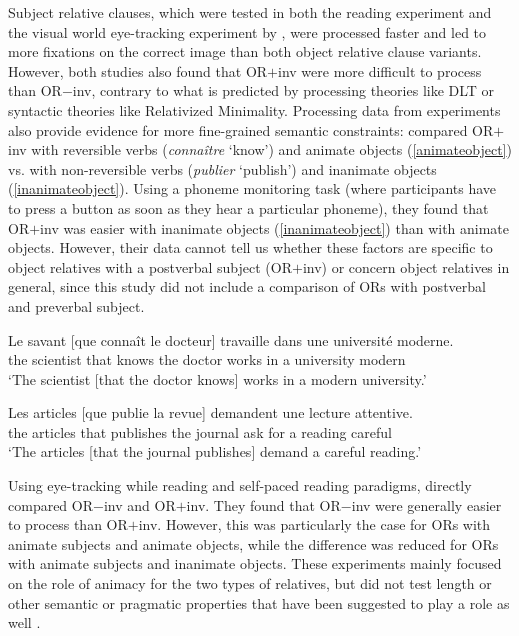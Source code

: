 \documentclass[output=paper]{langscibook}
\begin{document}
Subject relative clauses, which were tested in both the
\citet{Holmes1981} reading experiment and the visual world
eye-tracking experiment by \citet{pozniak2015processing}, were
processed faster and led to more fixations on the correct image than
both object relative clause variants. However, both studies also found
that OR$+$inv were more difficult to process than OR$-$inv, contrary to
what is predicted by processing theories like DLT or syntactic
theories like Relativized Minimality.  Processing data from
experiments also provide evidence for more fine-grained semantic
constraints: \citet{Frauenfelder1980} compared OR$+$inv with reversible
verbs (\textit{connaître} `know’) and animate objects
(\ref{animateobject}) vs. with non-reversible verbs
(\textit{publier} `publish’) and inanimate objects
(\ref{inanimateobject}). Using a phoneme monitoring task (where
participants have to press a button as soon as they hear a particular
phoneme), they found that OR$+$inv was easier with inanimate objects
(\ref{inanimateobject}) than with animate objects. However, their data
cannot tell us whether these factors are specific to object relatives
with a postverbal subject (OR$+$inv) or concern object relatives in
general, since this study did not include a comparison of ORs with
postverbal and preverbal subject.

\begin{exe}
\ex \label{animateobject}
\gll Le savant [que connaît le docteur] travaille dans une université moderne. 
 \\   
 the scientist that knows the doctor works in a university modern \\
\glt `The scientist [that the doctor knows] works in a modern university.'

\ex \label{inanimateobject}
\gll Les articles [que publie la revue] demandent une lecture attentive. \\    
 the articles that publishes the journal {ask for} a reading careful\\
\glt `The articles [that the journal publishes] demand a careful reading.'
\end{exe}


Using eye-tracking while reading and self-paced reading paradigms,
\citet{baudiffier2011effect} directly compared OR$-$inv and OR$+$inv. They
found that OR$-$inv were generally easier to process than OR$+$inv.
However, this was particularly the case for ORs with animate subjects
and animate objects, while the difference was reduced for ORs with
animate subjects and inanimate objects.  These experiments mainly
focused on the role of animacy for the two types of relatives, but did
not test length or other semantic or pragmatic properties that have
been suggested to play a role as well \citep [e.g.][]{catherine1997}.
\end{document}
